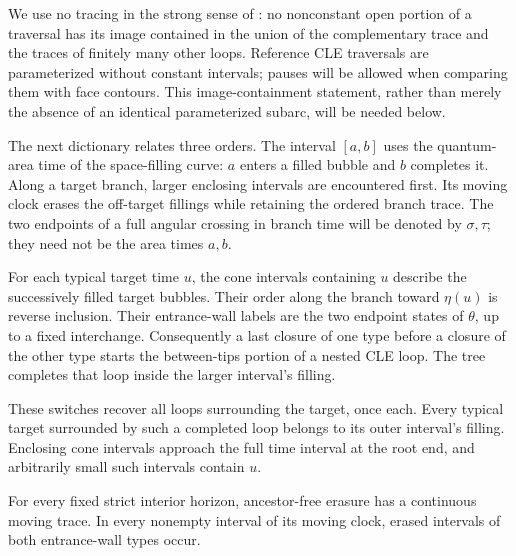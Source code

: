 We use no tracing in the strong sense of
\cite[Definitions~2.4--2.5]{GwynneMillerQianCLE}: no nonconstant
open portion of a traversal has its image contained in the union of
the complementary trace and the traces of finitely many other loops.  Reference
CLE traversals are parameterized without constant intervals; pauses
will be allowed when comparing them with face contours.  This
image-containment statement, rather than merely the absence of an
identical parameterized subarc, will be needed below.

The next dictionary relates three orders.  The interval $[a,b]$ uses
the quantum-area time of the space-filling curve: $a$ enters a filled
bubble and $b$ completes it.  Along a target branch, larger enclosing
intervals are encountered first.  Its moving clock erases the off-target
fillings while retaining the ordered branch trace.  The two endpoints
of a full angular crossing in branch time will be denoted by
$\sigma,\tau$; they need not be the area times $a,b$.

\begin{lemma}
\label{loop:switches}
For each typical target time $u$, the cone intervals containing $u$
describe the successively filled target bubbles.  Their order along the
branch toward $\eta(u)$ is reverse inclusion.  Their entrance-wall labels
are the two endpoint states of $\theta$, up to a fixed interchange.
Consequently a last closure of one type before a closure of the other
type starts the between-tips portion of a nested CLE loop.  The tree
completes that loop inside the larger interval's filling.

These switches recover all loops surrounding the target, once each.
Every typical target surrounded by such a completed loop belongs to its
outer interval's filling.  Enclosing cone intervals approach the full
time interval at the root end, and arbitrarily small such intervals
contain $u$.

For every fixed strict interior horizon, ancestor-free erasure has a
continuous moving trace.  In every nonempty interval of its moving
clock, erased intervals of both entrance-wall types occur.
\end{lemma}

